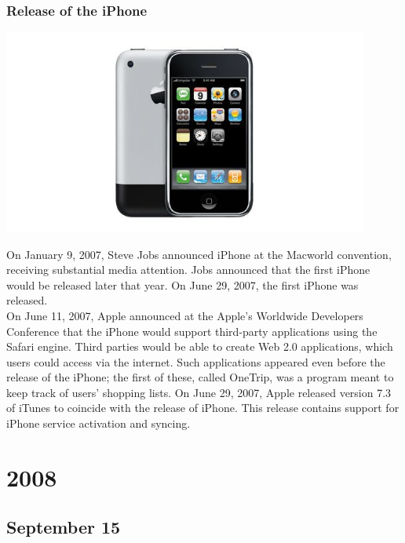 \documentclass[11pt]{report}
\begin{document}
\subsection{Release of the iPhone}
\vspace{2mm}\begin{center}\includegraphics[width=12cm]{./img/iphone1.jpg}\end{center}
On January 9, 2007, Steve Jobs announced iPhone at the Macworld convention, receiving substantial media attention. Jobs announced that the first iPhone would be released later that year. On June 29, 2007, the first iPhone was released.\\
\indent On June 11, 2007, Apple announced at the Apple's Worldwide Developers Conference that the iPhone would support third-party applications using the Safari engine. Third parties would be able to create Web 2.0 applications, which users could access via the internet. Such applications appeared even before the release of the iPhone; the first of these, called OneTrip, was a program meant to keep track of users' shopping lists. On June 29, 2007, Apple released version 7.3 of iTunes to coincide with the release of iPhone. This release contains support for iPhone service activation and syncing.

\chapter{2008}
\section{September 15}
\end{document}
